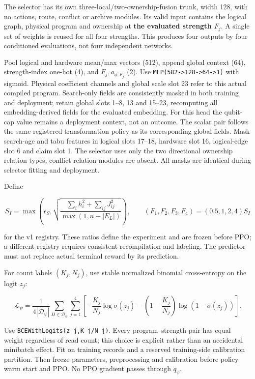 \documentclass[10pt,a4paper]{article}
\begin{document}
The selector has its own three-local/two-ownership-fusion trunk, width
128, with no actions, route, conflict or archive modules. Its valid
input contains the logical graph, physical program and ownership at
\textbf{the evaluated strength \(F_j\)}. A single set of weights is
reused for all four strengths. This produces four outputs by four
conditioned evaluations, not four independent networks.

Pool logical and hardware mean/max vectors (512), append global context
(64), strength-index one-hot (4), and \(F_j,a_{\phi,F_j}\) (2). Use
\texttt{MLP(582-\textgreater{}128-\textgreater{}64-\textgreater{}1)}
with sigmoid. Physical coefficient channels and global scale slot 23
refer to this actual compiled program. Search-only fields are
consistently masked in both training and deployment; retain global slots
1--8, 13 and 15--23, recomputing all embedding-derived fields for the
evaluated embedding. For this head the qubit-cap value remains a
deployment context, not an outcome. The scalar pair follows the same
registered transformation policy as its corresponding global fields.
Mask search-age and tabu features in logical slots 17--18, hardware slot
16, logical-edge slot 6 and claim slot 1. The selector uses only the two
directional ownership relation types; conflict relation modules are
absent. All masks are identical during selector fitting and deployment.

Define

\[
S_I=\max\left(\epsilon_S,
\sqrt{\frac{\sum_i h_i^2+\sum_{ij}J_{ij}^2}{\max(1,n+|E_L|)}}\right),
\qquad (F_1,F_2,F_3,F_4)=(0.5,1,2,4)S_I
\tag{17}
\]

for the v1 registry. These ratios define the experiment and are frozen
before PPO; a different registry requires consistent recompilation and
labeling. The predictor must not replace actual terminal reward by its
prediction.

For count labels \((K_j,N_j)\), use stable normalized binomial
cross-entropy on the logit \(z_j\):

\[
\mathcal L_\psi=\frac{1}{4|\mathcal D_\psi|}
\sum_{\Pi\in\mathcal D_\psi}\sum_{j=1}^{4}
\left[-\frac{K_j}{N_j}\log\sigma(z_j)
-\left(1-\frac{K_j}{N_j}\right)\log(1-\sigma(z_j))\right].
\tag{18}
\]

Use \texttt{BCEWithLogits(z\_j,K\_j/N\_j)}. Every program--strength pair
has equal weight regardless of read count; this choice is explicit
rather than an accidental minibatch effect. Fit on training records and
a reserved training-side calibration partition. Then freeze parameters,
preprocessing and calibration before policy warm start and PPO. No PPO
gradient passes through \(q_\psi\).
\end{document}
